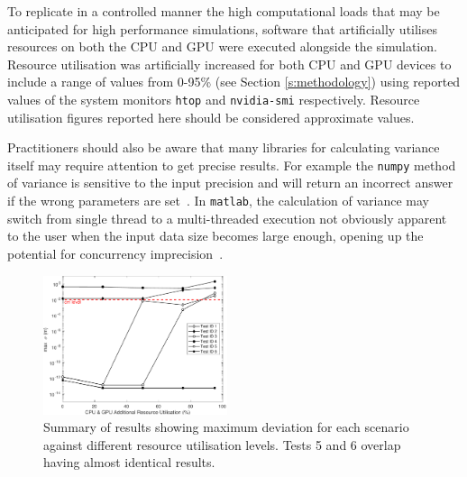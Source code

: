 \documentclass[letterpaper, 10 pt, journal, twoside]{IEEEtran}
\begin{document}
To replicate in a controlled manner the high computational loads that may be anticipated for high performance simulations, software that artificially utilises resources on both the CPU and GPU were executed alongside the simulation. 
%
Resource utilisation was artificially increased for both CPU and GPU devices to include a range of values from 0-95\% (see Section \ref{s:methodology}) using reported values of the system monitors \texttt{htop} and \texttt{nvidia-smi} respectively. Resource utilisation figures reported here should be considered approximate values.

Practitioners should also be aware that many libraries for calculating variance itself may require attention to get precise results. For example the \texttt{numpy} method of variance is sensitive to the input precision and will return an incorrect answer if the wrong parameters are set~\cite{NumpyVar}. In \texttt{matlab}, the calculation of variance may switch from single thread to a multi-threaded execution not obviously apparent to the user when the input data size becomes large enough, opening up the potential for concurrency imprecision~\cite{matlab_parallel_computing}. 

\begin{figure}[t]
    \centering
    \includegraphics[width=0.48\textwidth]{Other/Figures/ExperimentsStressSummaryV5.pdf}
    \caption{Summary of results showing maximum deviation for each scenario against different resource utilisation levels. Tests 5 and 6 overlap having almost identical results.}
    \label{ExperimentsStressSummary}
\end{figure}
	
\end{document}

